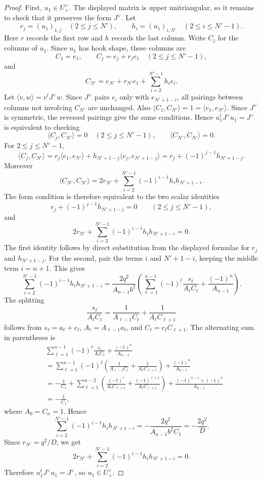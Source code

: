 \begin{proof}
First, \(u_1\in U_+^\vee\). The displayed matrix is upper unitriangular, so it remains to check that it preserves the form \(J^\vee\). Let
\[
r_j=(u_1)_{1,j}\quad(2\le j\le N'),
\qquad
h_i=(u_1)_{i,N'}\quad(2\le i\le N'-1).
\]
Here \(r\) records the first row and \(h\) records the last column. Write \(C_j\) for the columns of \(u_1\). Since \(u_1\) has hook shape, these columns are
\[
C_1=e_1,\qquad
C_j=e_j+r_je_1\quad(2\le j\le N'-1),
\]
and
\[
C_{N'}=e_{N'}+r_{N'}e_1+\sum_{i=2}^{N'-1}h_ie_i.
\]
Let \(\langle v,w\rangle=v^tJ^\vee w\). Since \(J^\vee\) pairs \(e_i\) only with \(e_{N'+1-i}\), all pairings between columns not involving \(C_{N'}\) are unchanged. Also \(\langle C_1,C_{N'}\rangle=1=\langle e_1,e_{N'}\rangle\). Since \(J^\vee\) is symmetric, the reversed pairings give the same conditions. Hence \(u_1^tJ^\vee u_1=J^\vee\) is equivalent to checking
\[
\langle C_j,C_{N'}\rangle=0\quad(2\le j\le N'-1),
\qquad
\langle C_{N'},C_{N'}\rangle=0.
\]
For \(2\le j\le N'-1\),
\[
\langle C_j,C_{N'}\rangle
=r_j\langle e_1,e_{N'}\rangle
+h_{N'+1-j}\langle e_j,e_{N'+1-j}\rangle
=r_j+(-1)^{j-1}h_{N'+1-j}.
\]
Moreover
\[
\langle C_{N'},C_{N'}\rangle
=2r_{N'}+\sum_{i=2}^{N'-1}(-1)^{i-1}h_ih_{N'+1-i}.
\]
The form condition is therefore equivalent to the two scalar identities
\[
r_j+(-1)^{j-1}h_{N'+1-j}=0
\qquad(2\le j\le N'-1),
\]
and
\[
2r_{N'}+\sum_{i=2}^{N'-1}(-1)^{i-1}h_ih_{N'+1-i}=0.
\]
The first identity follows by direct substitution from the displayed formulae for \(r_j\) and \(h_{N'+1-j}\). For the second, pair the terms \(i\) and \(N'+1-i\), keeping the middle term \(i=n+1\). This gives
\[
\sum_{i=2}^{N'-1}(-1)^{i-1}h_ih_{N'+1-i}
=
\frac{2q^2}{A_{n-1}b^2}
\left(
\sum_{\ell=1}^{n-1}(-1)^\ell\frac{s_\ell}{A_\ell C_\ell}
+\frac{(-1)^n}{A_{n-1}}
\right).
\]
The splitting
\[
\frac{s_\ell}{A_\ell C_\ell}
=
\frac{1}{A_{\ell-1}C_\ell}
+
\frac{1}{A_\ell C_{\ell+1}}
\]
follows from \(s_\ell=a_\ell+c_\ell\), \(A_\ell=A_{\ell-1}a_\ell\), and \(C_\ell=c_\ell C_{\ell+1}\). The alternating sum in parentheses is
\[
\begin{aligned}
&\sum_{\ell=1}^{n-1}(-1)^\ell\frac{s_\ell}{A_\ell C_\ell}
+\frac{(-1)^n}{A_{n-1}}\\
&=
\sum_{\ell=1}^{n-1}(-1)^\ell
\left(
\frac{1}{A_{\ell-1}C_\ell}
+
\frac{1}{A_\ell C_{\ell+1}}
\right)
+\frac{(-1)^n}{A_{n-1}}\\
&=
-\frac{1}{C_1}
+\sum_{\ell=1}^{n-2}
\left(
\frac{(-1)^\ell}{A_\ell C_{\ell+1}}
+
\frac{(-1)^{\ell+1}}{A_\ell C_{\ell+1}}
\right)
+\frac{(-1)^{n-1}+(-1)^n}{A_{n-1}}\\
&=-\frac{1}{C_1},
\end{aligned}
\]
where \(A_0=C_n=1\). Hence
\[
\sum_{i=2}^{N'-1}(-1)^{i-1}h_ih_{N'+1-i}
=
-\frac{2q^2}{A_{n-1}b^2C_1}
=-\frac{2q^2}{D}.
\]
Since \(r_{N'}=q^2/D\), we get
\[
2r_{N'}+\sum_{i=2}^{N'-1}(-1)^{i-1}h_ih_{N'+1-i}=0.
\]
Therefore \(u_1^tJ^\vee u_1=J^\vee\), so \(u_1\in U_+^\vee\).


\end{proof}

